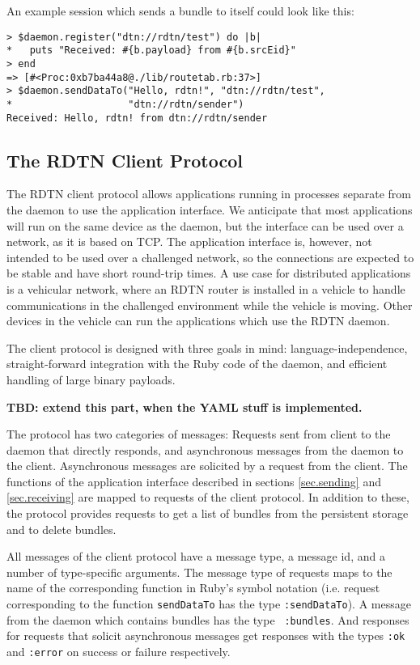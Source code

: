 \documentclass{article}
\begin{document}
An example session which sends a bundle to itself could look like this:

\begin{verbatim}
> $daemon.register("dtn://rdtn/test") do |b|
*   puts "Received: #{b.payload} from #{b.srcEid}"
> end
=> [#<Proc:0xb7ba44a8@./lib/routetab.rb:37>]
> $daemon.sendDataTo("Hello, rdtn!", "dtn://rdtn/test",
*                    "dtn://rdtn/sender")
Received: Hello, rdtn! from dtn://rdtn/sender
\end{verbatim}

\subsection{The RDTN Client Protocol}\label{sec.client-protocol}

The RDTN client protocol allows applications running in processes separate from
the daemon to use the application interface. We anticipate that most
applications will run on the same device as the daemon, but the interface can be
used over a network, as it is based on TCP. The application interface is,
however, not intended to be used over a challenged network, so the connections
are expected to be stable and have short round-trip times. A use case for
distributed applications is a vehicular network, where an RDTN router is
installed in a vehicle to handle communications in the challenged environment
while the vehicle is moving. Other devices in the vehicle can run the
applications which use the RDTN daemon.

The client protocol is designed with three goals in mind: language-independence,
straight-forward integration with the Ruby code of the daemon, and efficient
handling of large binary payloads. 

{\bf TBD: extend this part, when the YAML stuff is implemented.}

The protocol has two categories of messages: Requests sent from client to the
daemon that directly responds, and asynchronous messages from the daemon to the
client. Asynchronous messages are solicited by a request from the client. The
functions of the application interface described in sections \ref{sec.sending}
and \ref{sec.receiving} are mapped to requests of the client protocol. In
addition to these, the protocol provides requests to get a list of bundles from
the persistent storage and to delete bundles.

All messages of the client protocol have a message type, a message id, and a
number of type-specific arguments. The message type of requests maps to the name
of the corresponding function in Ruby's symbol notation (i.e. request
corresponding to the function {\tt sendDataTo} has the type {\tt :sendDataTo}).
A message from the daemon which contains bundles has the type {\tt
:bundles}. And responses for requests that solicit asynchronous messages get
responses with the types {\tt :ok} and {\tt :error} on success or failure
respectively.
\end{document}
